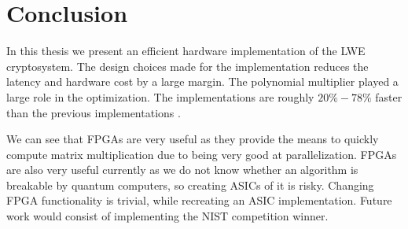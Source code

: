 \chapter{Conclusion\label{conclusion}}
In this thesis we present an efficient hardware implementation of the LWE
cryptosystem. The design choices made for the implementation reduces the
latency and hardware cost by a large margin. The polynomial multiplier played a
large role in the optimization. The implementations are roughly $20\% - 78\%$
faster than the previous implementations \citep{FPGA_Post_Quantum_Primitives}.

We can see that FPGAs are very useful as they provide the means to quickly
compute matrix multiplication due to being very good at parallelization. FPGAs
are also very useful currently as we do not know whether an algorithm is
breakable by quantum computers, so creating ASICs of it is risky. Changing FPGA
functionality is trivial, while recreating an ASIC implementation. Future work
would consist of implementing the NIST competition winner.
